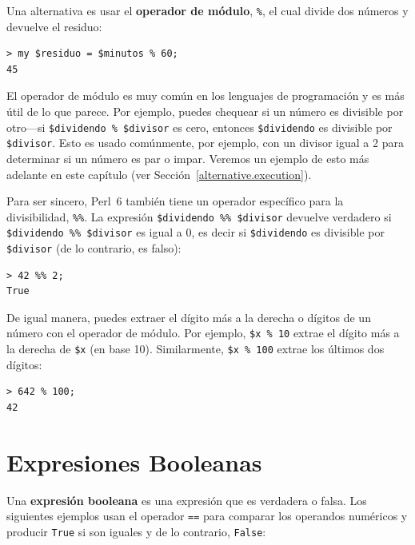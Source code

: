 Una alternativa es usar el {\bf operador de módulo}, \verb|%|,
el cual divide dos números y devuelve el residuo:

\begin{verbatim}
> my $residuo = $minutos % 60;
45
\end{verbatim}
%
El operador de módulo es muy común en los lenguajes de programación
y es más útil de lo que parece. Por ejemplo, puedes chequear si
un número es divisible por otro---si {\tt \$dividendo \% \$divisor} es cero, entonces {\tt \$dividendo} es divisible por {\tt \$divisor}. 
Esto es usado comúnmente, por ejemplo, con un divisor igual a 2 para determinar si un número es par o impar. Veremos un ejemplo
de esto más adelante en este capítulo (ver Sección~\ref{alternative.execution}).

Para ser sincero, Perl~6 también tiene un operador específico 
para la divisibilidad, \verb|%%|. La expresión
\verb|$dividendo %% $divisor| devuelve verdadero si 
\verb|$dividendo %% $divisor| es igual a 0,
es decir si {\tt \$dividendo} es divisible por {\tt \$divisor} 
(de lo contrario, es falso):
\begin{verbatim}
> 42 %% 2;
True
\end{verbatim}

De igual manera, puedes extraer el dígito más a la
derecha o dígitos de un número con el operador
de módulo. Por ejemplo, {\tt \$x \% 10}  extrae el
dígito más a la derecha de {\tt \$x} (en base 10).
Similarmente, {\tt \$x \% 100} extrae los últimos dos 
dígitos:

\begin{verbatim}
> 642 % 100;
42
\end{verbatim}
%



\section{Expresiones Booleanas}

Una {\bf expresión booleana} es una expresión que es
verdadera o falsa. Los siguientes ejemplos usan el operador
{\tt ==} para comparar los operandos numéricos y producir
{\tt True} si son iguales y de lo contrario, {\tt False}:

